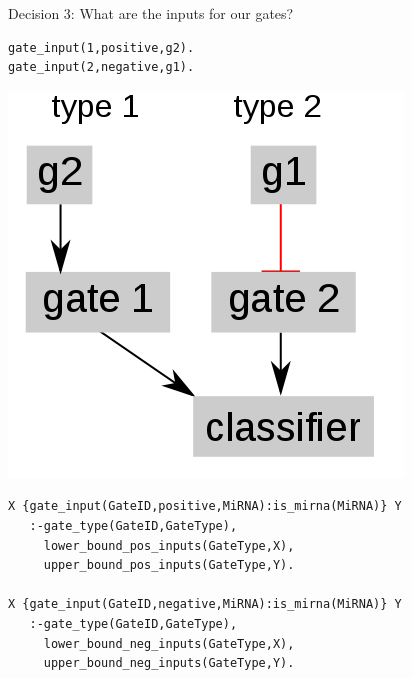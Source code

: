\documentclass[10pt,dvipsnames]{beamer}
\begin{document}
\begin{frame}[fragile]{Decision 3: What are the inputs for our gates?}
\vspace{0.3cm}
\small
\begin{minipage}{0.45\textwidth}
\color{my_example_color}
\begin{verbatim}
gate_input(1,positive,g2).
gate_input(2,negative,g1).
\end{verbatim}
\end{minipage}
\hfill
\begin{minipage}{0.45\textwidth}
\begin{center}
\includegraphics[scale=0.2]{exp3.png}
\end{center}
\end{minipage}
\vspace{0.5cm}

\begin{Verbatim}
X {gate_input(GateID,positive,MiRNA):is_mirna(MiRNA)} Y 
   :-gate_type(GateID,GateType),
     lower_bound_pos_inputs(GateType,X), 
     upper_bound_pos_inputs(GateType,Y).

X {gate_input(GateID,negative,MiRNA):is_mirna(MiRNA)} Y 
   :-gate_type(GateID,GateType),
     lower_bound_neg_inputs(GateType,X),
     upper_bound_neg_inputs(GateType,Y).
\end{Verbatim}
\end{frame}
\end{document}
